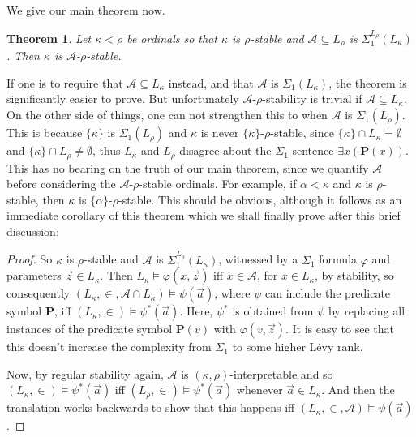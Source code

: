 \documentclass{article}
\theoremstyle{definition}
\theoremstyle{plain}
\newtheorem{theorem}[definition]{Theorem}
\theoremstyle{plain}
\theoremstyle{plain}
\theoremstyle{plain}
\theoremstyle{remark}
\theoremstyle{remark}
\theoremstyle{remark}
\theoremstyle{plain}
\theoremstyle{plain}
\theoremstyle{plain}
\begin{document}
We give our main theorem now.

\begin{theorem}
\label{PredicateElimination}
Let $\kappa < \rho$ be ordinals so that $\kappa$ is $\rho$-stable and $\mathcal{A} \subseteq L_\rho$ is $\Sigma_1^{L_\rho}(L_\kappa)$. Then $\kappa$ is $\mathcal{A}$-$\rho$-stable.
\end{theorem}

If one is to require that $\mathcal{A} \subseteq L_\kappa$ instead, and that $\mathcal{A}$ is $\Sigma_1(L_\kappa)$, the theorem is significantly easier to prove. But unfortunately $\mathcal{A}$-$\rho$-stability is trivial if $\mathcal{A} \subseteq L_\kappa$. On the other side of things, one can not strengthen this to when $\mathcal{A}$ is $\Sigma_1(L_\rho)$. This is because $\{\kappa\}$ is $\Sigma_1(L_\rho)$ and $\kappa$ is never $\{\kappa\}$-$\rho$-stable, since $\{\kappa\} \cap L_\kappa = \emptyset$ and $\{\kappa\} \cap L_\rho \neq \emptyset$, thus $L_\kappa$ and $L_\rho$ disagree about the $\Sigma_1$-sentence $\exists x (\mathbf{P}(x))$. This has no bearing on the truth of our main theorem, since we quantify $\mathcal{A}$ before considering the $\mathcal{A}$-$\rho$-stable ordinals. For example, if $\alpha < \kappa$ and $\kappa$ is $\rho$-stable, then $\kappa$ is $\{\alpha\}$-$\rho$-stable. This should be obvious, although it follows as an immediate corollary of this theorem which we shall finally prove after this brief discussion:

\begin{proof}
So $\kappa$ is $\rho$-stable and $\mathcal{A}$ is $\Sigma_1^{L_\rho}(L_\kappa)$, witnessed by a $\Sigma_1$ formula $\varphi$ and parameters $\vec{z} \in L_\kappa$. Then $L_\kappa \models \varphi(x, \vec{z})$ iff $x \in \mathcal{A}$, for $x \in L_\kappa$, by stability, so consequently $(L_\kappa, \in, \mathcal{A} \cap L_\kappa) \models \psi(\vec{a})$, where $\psi$ can include the predicate symbol $\mathbf{P}$, iff $(L_\kappa, \in) \models \psi^*(\vec{a})$. Here, $\psi^*$ is obtained from $\psi$ by replacing all instances of the predicate symbol $\mathbf{P}(v)$ with $\varphi(v, \vec{z})$. It is easy to see that this doesn't increase the complexity from $\Sigma_1$ to some higher Lévy rank.

Now, by regular stability again, $\mathcal{A}$ is $(\kappa, \rho)$-interpretable and so $(L_\kappa, \in) \models \psi^*(\vec{a})$ iff $(L_\rho, \in) \models \psi^*(\vec{a})$ whenever $\vec{a} \in L_\kappa$. And then the translation works backwards to show that this happens iff $(L_\kappa, \in, \mathcal{A}) \models \psi(\vec{a})$.
\end{proof}
\end{document}
